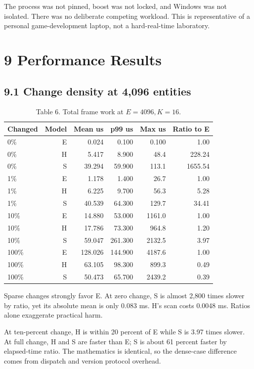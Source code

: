 The process was not pinned, boost was not locked, and Windows was not isolated. There was no deliberate competing workload. This is representative of a personal game-development laptop, not a hard-real-time laboratory.

\section{9 Performance Results}

\subsection{9.1 Change density at 4,096 entities}

\begin{table}
\caption{Table 6. Total frame work at \(E=4096,K=16\).}
\begin{tabular}{lrrrrr}
Changed & Model & Mean us & p99 us & Max us & Ratio to E \\
\hline
0\% & E & 0.024 & 0.100 & 0.100 & 1.00 \\
0\% & H & 5.417 & 8.900 & 48.4 & 228.24 \\
0\% & S & 39.294 & 59.900 & 113.1 & 1655.54 \\
1\% & E & 1.178 & 1.400 & 26.7 & 1.00 \\
1\% & H & 6.225 & 9.700 & 56.3 & 5.28 \\
1\% & S & 40.539 & 64.300 & 129.7 & 34.41 \\
10\% & E & 14.880 & 53.000 & 1161.0 & 1.00 \\
10\% & H & 17.786 & 73.300 & 964.8 & 1.20 \\
10\% & S & 59.047 & 261.300 & 2132.5 & 3.97 \\
100\% & E & 128.026 & 144.900 & 4187.6 & 1.00 \\
100\% & H & 63.105 & 98.300 & 899.3 & 0.49 \\
100\% & S & 50.473 & 65.700 & 2439.2 & 0.39 \\
\end{tabular}
\end{table}

Sparse changes strongly favor E. At zero change, S is almost 2,800 times slower by ratio, yet its absolute mean is only 0.083 ms. H's scan costs 0.0048 ms. Ratios alone exaggerate practical harm.

At ten-percent change, H is within 20 percent of E while S is 3.97 times slower. At full change, H and S are faster than E; S is about 61 percent faster by elapsed-time ratio. The mathematics is identical, so the dense-case difference comes from dispatch and version protocol overhead.


